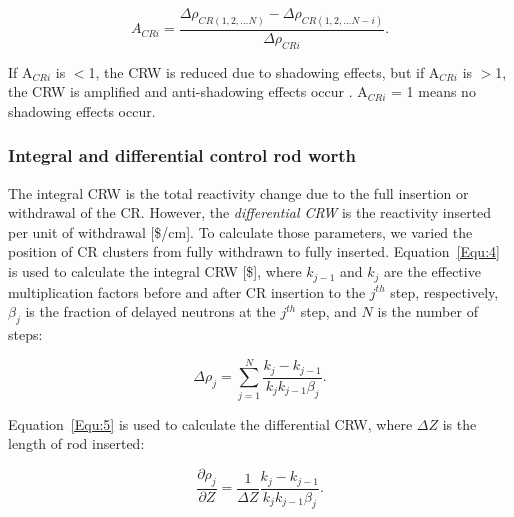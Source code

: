 \begin{equation}
\label{Equ:3}
{{A}_{CRi}}=\dfrac{{{\Delta}{\rho}_{CR(1,2,\ldots N)}}-{{\Delta}{\rho}_{CR(1,2,\ldots N-i)}}}{{\Delta}{\rho}_{CRi}}.
\end{equation}

If A$_{CRi}$ is $<$1, the CRW is reduced due to shadowing effects, but if A$_{CRi}$ is $>$1, the CRW is amplified and anti-shadowing effects occur \cite{girardin2007control}. A$_{CRi}$ = 1 means no shadowing effects occur.

\subsubsection{Integral and differential control rod worth}

The integral CRW is the total reactivity change due to the full 
insertion or withdrawal of the CR. However, the \textit{differential CRW} is the
reactivity inserted per unit of withdrawal [\$/cm]. To calculate those 
parameters, we varied the position of CR clusters from fully withdrawn to 
fully inserted. Equation~\ref{Equ:4} is used to calculate the integral CRW 
[\$], where $k_{j-1}$ and $k_{j}$ are the effective multiplication factors 
before and after CR insertion to the $j$$^{th}$ step, respectively, $\beta_{j}$ is the
fraction of delayed neutrons at the $j$$^{th}$ step, and $N$ is the number of steps:

\begin{equation}
\label{Equ:4}
{{\Delta}{\rho}_{j}}=\sum_{j=1}^{N}\dfrac{{k_{j}}-{k_{j-1}}}{{{k_{j}}{k_{j-1}}}{{\beta}_{j}}}.
\end{equation}

Equation~\ref{Equ:5} is used to calculate the differential CRW, where 
$\Delta Z$ is the length of rod inserted:

\begin{equation}
\label{Equ:5}
\dfrac{{\partial}{\rho}_{j}}{{\partial{Z}}}=\dfrac{1}{{\Delta}{Z}}\dfrac{{k_{j}}-{k_{j-1}}}{{{k_{j}}{k_{j-1}}}{{\beta}_{j}}}.
\end{equation}


